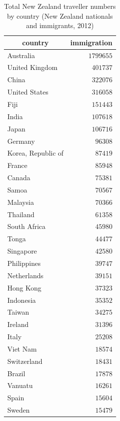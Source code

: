 \documentclass{article}
\begin{document}
\begin{itemize}
\begin{table}
\caption{Total New Zealand traveller numbers by country (New Zealand nationals and immigrants, 2012)}
\begin{center}
\begin{tabular}{lr}
\hline\hline
\multicolumn{1}{c}{country}&\multicolumn{1}{c}{immigration}\tabularnewline
\hline
Australia&$1799655$\tabularnewline
United Kingdom&$ 401737$\tabularnewline
China&$ 322076$\tabularnewline
United States&$ 316058$\tabularnewline
Fiji&$ 151443$\tabularnewline
India&$ 107618$\tabularnewline
Japan&$ 106716$\tabularnewline
Germany&$  96308$\tabularnewline
Korea, Republic of&$  87419$\tabularnewline
France&$  85948$\tabularnewline
Canada&$  75381$\tabularnewline
Samoa&$  70567$\tabularnewline
Malaysia&$  70366$\tabularnewline
Thailand&$  61358$\tabularnewline
South Africa&$  45980$\tabularnewline
Tonga&$  44477$\tabularnewline
Singapore&$  42580$\tabularnewline
Philippines&$  39747$\tabularnewline
Netherlands&$  39151$\tabularnewline
Hong Kong&$  37323$\tabularnewline
Indonesia&$  35352$\tabularnewline
Taiwan&$  34275$\tabularnewline
Ireland&$  31396$\tabularnewline
Italy&$  25208$\tabularnewline
Viet Nam&$  18574$\tabularnewline
Switzerland&$  18431$\tabularnewline
Brazil&$  17878$\tabularnewline
Vanuatu&$  16261$\tabularnewline
Spain&$  15604$\tabularnewline
Sweden&$  15479$\tabularnewline
\hline
\end{tabular}\end{center}\label{table:immigration12}
\end{table}



\end{itemize}
\end{document}
